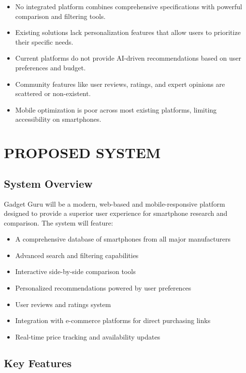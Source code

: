 \documentclass[12pt]{article}
\begin{document}
\begin{itemize}
    \item No integrated platform combines comprehensive specifications with powerful comparison and filtering tools.
    \item Existing solutions lack personalization features that allow users to prioritize their specific needs.
    \item Current platforms do not provide AI-driven recommendations based on user preferences and budget.
    \item Community features like user reviews, ratings, and expert opinions are scattered or non-existent.
    \item Mobile optimization is poor across most existing platforms, limiting accessibility on smartphones.
\end{itemize}

\section{PROPOSED SYSTEM}

\subsection{System Overview}
Gadget Guru will be a modern, web-based and mobile-responsive platform designed to provide a superior user experience for smartphone research and comparison. The system will feature:

\begin{itemize}
    \item A comprehensive database of smartphones from all major manufacturers
    \item Advanced search and filtering capabilities
    \item Interactive side-by-side comparison tools
    \item Personalized recommendations powered by user preferences
    \item User reviews and ratings system
    \item Integration with e-commerce platforms for direct purchasing links
    \item Real-time price tracking and availability updates
\end{itemize}

\subsection{Key Features}
\end{document}
